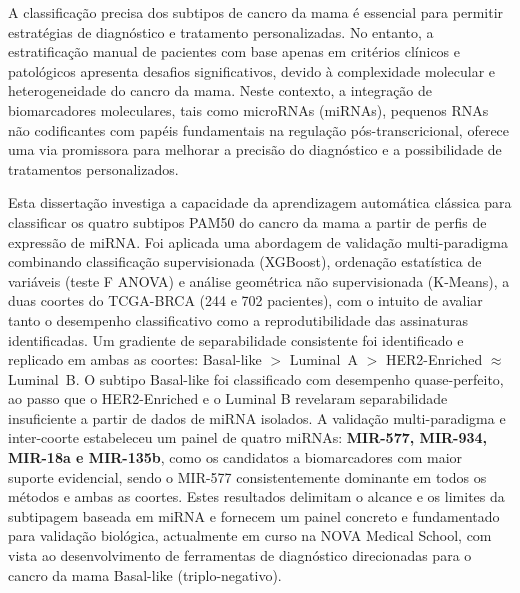 
%

A classificação precisa dos subtipos de cancro da mama é essencial para
permitir estratégias de diagnóstico e tratamento personalizadas. No entanto, a
estratificação manual de pacientes com base apenas em critérios clínicos e
patológicos apresenta desafios significativos, devido à complexidade molecular
e heterogeneidade do cancro da mama. Neste contexto, a integração de
biomarcadores moleculares, tais como microRNAs (miRNAs), pequenos RNAs não
codificantes com papéis fundamentais na regulação pós-transcricional, oferece
uma via promissora para melhorar a precisão do diagnóstico e a possibilidade de
tratamentos personalizados.

Esta dissertação investiga a capacidade da aprendizagem automática clássica
para classificar os quatro subtipos PAM50 do cancro da mama a partir de perfis
de expressão de miRNA. Foi aplicada uma abordagem de validação multi-paradigma
combinando classificação supervisionada (XGBoost), ordenação estatística de
variáveis (teste F ANOVA) e análise geométrica não supervisionada (K-Means),
a duas coortes do TCGA-BRCA (244 e 702 pacientes), com o intuito
de avaliar tanto o desempenho classificativo como a reprodutibilidade das
assinaturas identificadas. Um gradiente de separabilidade consistente foi identificado e replicado em
ambas as coortes: Basal-like $>$ Luminal~A $>$ HER2-Enriched $\approx$
Luminal~B. O subtipo Basal-like foi classificado com desempenho
quase-perfeito, ao passo que o HER2-Enriched e o Luminal B revelaram
separabilidade insuficiente a partir de dados de miRNA isolados. A validação
multi-paradigma e inter-coorte estabeleceu um painel de quatro miRNAs:
\textbf{MIR-577, MIR-934, MIR-18a e MIR-135b}, como os candidatos a
biomarcadores com maior suporte evidencial, sendo o MIR-577 consistentemente
dominante em todos os métodos e ambas as coortes. Estes resultados delimitam o alcance e os limites da subtipagem baseada em
miRNA e fornecem um painel concreto e fundamentado para validação biológica,
actualmente em curso na NOVA Medical School, com vista ao desenvolvimento de
ferramentas de diagnóstico direcionadas para o cancro da mama Basal-like
(triplo-negativo).

